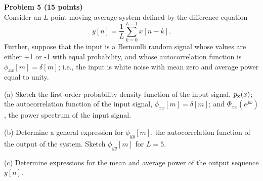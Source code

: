 \documentclass[12pt]{report}
\begin{document}
\vspace{5mm}

\noindent
{\bf Problem 5 (15 points)} \\
Consider an $L$-point moving average system defined by the difference equation
\begin{equation}
\label{eq:1}
y[n]=\frac{1}{L} \sum_{k=0}^{L-1} x[n-k].
\end{equation}
Further, suppose that the input is a Bernoulli random signal whose
values are either +1 or -1 with equal probability, and whose
autocorrelation function is $\phi_{xx}[m]=\delta[m]$; i.e., the
input is white noise with mean zero and average power equal to
unity.
\begin{description}
\item{(a)}
Sketch the first-order probability density function of the
input signal, $p_{\bf x}(x)$; the autocorrelation function of
the input signal, $\phi_{xx}[m]=\delta[m]$; and
$\Phi_{xx}(e^{j\omega})$, the power spectrum of the input signal.
\item{(b)}
 Determine a general expression for $\phi_{yy}[m]$, the autocorrelation
function of the output of the system. Sketch $\phi_{yy}[m]$ for $L=5$.
\item{(c)} Determine expressions for the mean and average power of
the output sequence $y[n]$.
\end{description}
\newpage
\end{document}
